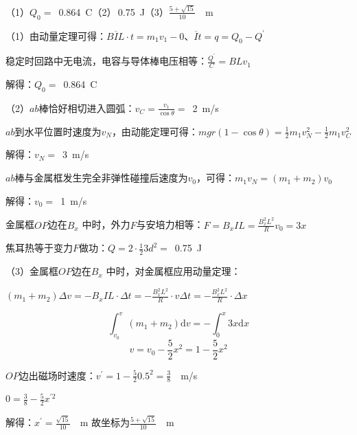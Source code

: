 \begin{answer}
    （1）\(Q_0 =\) \,\qty{0.864}{C}（2）\,\qty{0.75}{J}（3）\(\frac{5 + \sqrt{15}}{10}\) \,\qty{}{m}

    （1）由动量定理可得：\(B \overline{I}L\cdot t = m_1v_1 - 0\)、\(\overline{I}t = q = Q_0 - Q^{\prime}\)

    稳定时回路中无电流，电容与导体棒电压相等：\(\frac{Q^{\prime}}{C} = BLv_1\)

    解得：\(Q_0 =\) \,\qty{0.864}{C}

    （2）\(ab\)棒恰好相切进入圆弧：\(v_C = \frac{v_1}{\cos \theta} =\) \,\qty{2}{m/s}

    \(ab\)到水平位置时速度为\(v_N\)，由动能定理可得：\(mgr(1 - \cos\theta) = \frac{1}{2}m_1v_N^2 - \frac{1}{2}m_1v_C^2\)

    解得：\(v_N =\) \,\qty{3}{m/s}

    \(ab\)棒与金属框发生完全非弹性碰撞后速度为\(v_0\)，可得：\(m_1v_{N} = (m_1 + m_2)v_0\)

    解得：\(v_0 =\) \,\qty{1}{m/s}

    金属框\(OP\)边在\(B_x\) 中时，外力\(F\)与安培力相等：\(F = B_xIL = \frac{B_x^2L^2}{R}v_0 = 3x\)

    焦耳热等于变力\(F\)做功：\(Q = 2\cdot \frac{1}{2} 3d^2 =\) \,\qty{0.75}{J}

    （3）金属框\(OP\)边在\(B_x\) 中时，对金属框应用动量定理：
    
    \(  (m_1 + m_2)\Delta v =- B_xIL\cdot \Delta t =- \frac{B_x^2L^2}{R}\cdot v\Delta t = - \frac{B_x^2L^2}{R}\cdot\Delta x\)

    \[
        \int_{v_0}^{v} (m_1 + m_2) \mathrm{d} v = - \int_{0}^{x} 3x \mathrm{d} x
    \]
    \[
        v = v_0 - \frac{5}{2}x^2 = 1 - \frac{5}{2}x^2
    \]
    
    \(OP\)边出磁场时速度：\(v^{\prime} = 1 - \frac{5}{2}0.5^2 = \frac{3}{8}\) \,\qty{}{m/s}

    \(0 = \frac{3}{8} - \frac{5}{2}x^{\prime 2}\)

    解得：\(x^{\prime} = \frac{\sqrt{15}}{10}\) \,\qty{}{m}
    故坐标为\(\frac{5 + \sqrt{15}}{10}\) \,\qty{}{m}
\end{answer}